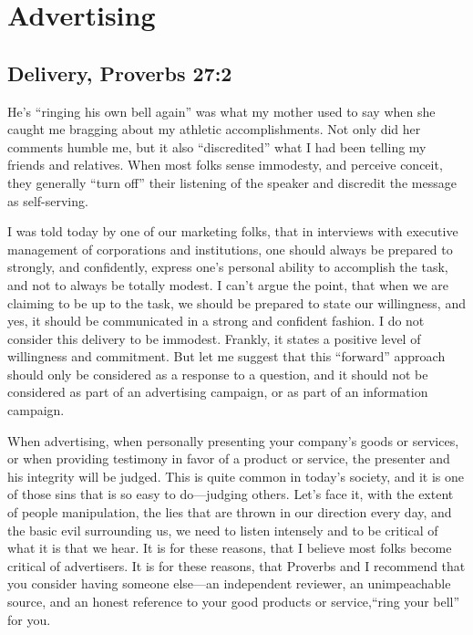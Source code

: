 \documentclass[12pt]{memoir}
\begin{document}
\section{Advertising}

\subsection[Delivery]{Delivery, Proverbs 27:2}


He's ``ringing his own bell again'' was what my mother used to say
when she caught me bragging about my athletic accomplishments. Not
only did her comments humble me, but it also ``discredited'' what
I had been telling my friends and relatives. When most folks sense
immodesty, and perceive conceit, they generally ``turn off'' their
listening of the speaker and discredit the message as self-serving.

I was told today by one of our marketing folks, that in interviews
with executive management of corporations and institutions, one should
always be prepared to strongly, and confidently, express one's personal
ability to accomplish the task, and not to always be totally modest.
I can't argue the point, that when we are claiming to be up to the
task, we should be prepared to state our willingness, and yes, it
should be communicated in a strong and confident fashion. I do not
consider this delivery to be immodest. Frankly, it states a positive
level of willingness and commitment. But let me suggest that this
``forward'' approach should only be considered as a response to
a question, and it should not be considered as part of an advertising
campaign, or as part of an information campaign.

When advertising, when personally presenting your company's goods
or services, or when providing testimony in favor of a product or
service, the presenter and his integrity will be judged. This is quite
common in today's society, and it is one of those sins that is so
easy to do---judging others. Let's face it, with the extent of people
manipulation, the lies that are thrown in our direction every day,
and the basic evil surrounding us, we need to listen intensely and
to be critical of what it is that we hear. It is for these reasons,
that I believe most folks become critical of advertisers. It is for
these reasons, that Proverbs and I recommend that you consider having
someone else---an independent reviewer, an unimpeachable source,
and an honest reference to your good products or service,``ring your
bell'' for you.
\end{document}
